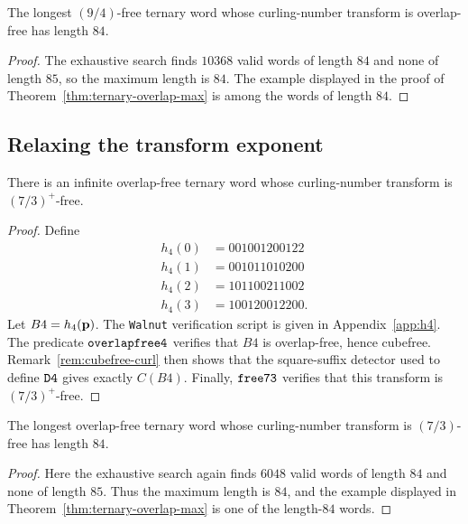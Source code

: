 \documentclass[12pt,reqno]{article}
\begin{document}
\begin{theorem} 
\label{thm:ternary-94-overlap-max}
The longest $(9/4)$-free ternary word whose curling-number transform is overlap-free has length $84$. 
\end{theorem}

\begin{proof} 
The exhaustive search finds $10368$ valid words of length $84$ and none of length $85$, so the maximum length is $84$.  The example displayed in the proof of Theorem~\ref{thm:ternary-overlap-max} is among the words of length $84$.
\end{proof}

\subsection{Relaxing the transform exponent}

\begin{theorem} 
\label{thm:ternary-overlap-73plus}
There is an infinite overlap-free ternary word whose curling-number transform is $(7/3)^+$-free. 
\end{theorem}

\begin{proof} 
Define
\begin{align*} 
h_4(0) &= 001001200122 \\
h_4(1) &= 001011010200 \\
h_4(2) &= 101100211002 \\
h_4(3) &= 100120012200 .
\end{align*}
Let $B4=h_4({\bf p})$.  The {\tt Walnut} verification script is given in Appendix~\ref{app:h4}.  The predicate ${\tt overlapfree4}$ verifies that $B4$ is overlap-free, hence cubefree.  Remark~\ref{rem:cubefree-curl} then shows that the square-suffix detector used to define ${\tt D4}$ gives exactly $C(B4)$.  Finally, ${\tt free73}$ verifies that this transform is $(7/3)^+$-free.
\end{proof}

\begin{theorem} 
\label{thm:ternary-overlap-73-max}
The longest overlap-free ternary word whose curling-number transform is $(7/3)$-free has length $84$. 
\end{theorem}

\begin{proof} 
Here the exhaustive search again finds $6048$ valid words of length $84$ and none of length $85$.  Thus the maximum length is $84$, and the example displayed in Theorem~\ref{thm:ternary-overlap-max} is one of the length-$84$ words.
\end{proof}
\end{document}
